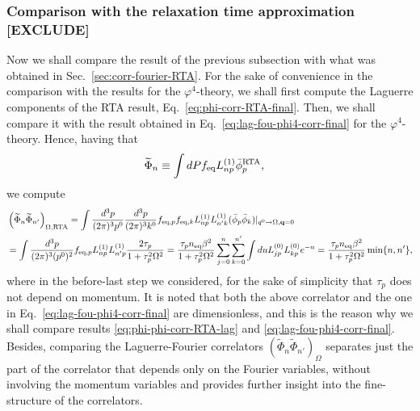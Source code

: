 \documentclass[aps,prd,preprint,nofootinbib,amsmath,amssymb,showpacs,longbibliography,singlecolumn,superscriptaddress,10pt]{revtex4-1}
\theoremstyle{plain}
\theoremstyle{definition}
\begin{document}
\subsubsection{Comparison with the relaxation time approximation [EXCLUDE]}

Now we shall compare the result of the previous subsection with what was obtained in Sec.~\ref{sec:corr-fourier-RTA}. For the sake of convenience in the comparison with the results for the $\varphi^{4}$-theory, we shall first compute the Laguerre components of the RTA result, Eq.~\eqref{eq:phi-corr-RTA-final}. Then, we shall compare it with the result obtained in Eq.~\eqref{eq:lag-fou-phi4-corr-final} for the $\varphi^{4}$-theory. Hence, having that 
%
\begin{equation}
\begin{aligned}
&
\widetilde{\Phi}_{n}
\equiv
\int dP f_{\mathrm{eq}}  L^{(1)}_{n {p}}  \Bar{\phi}_{p}^{\mathrm{RTA}},
\end{aligned}    
\end{equation}
%
we compute 
%
\begin{equation}
\label{eq:phi-phi-corr-RTA-lag}
\begin{aligned}
&
\left( \widetilde{\Phi}_n \widetilde{\Phi}_{n'} \right)_{\Omega, \mathrm{RTA}} 
=
\int \frac{d^{3}p}{(2 \pi)^{3} p^{0}} \frac{d^{3}p}{(2 \pi)^{3} k^{0}} f_{\mathrm{eq},p} f_{\mathrm{eq},k}  L^{(1)}_{n {p}} L^{(1)}_{n' {k}} 
(\Bar{\phi}_{p} \Bar{\phi}_{k}
)\vert_{q^{0} \to \Omega,{\bf q} = 0}
\\
&
=
\int \frac{d^{3}p}{(2 \pi)^{3} (p^{0})^{2}}  f_{\mathrm{eq},p}   L^{(1)}_{n {p}} L^{(1)}_{n' {p}} 
\dfrac{2\tau_p}{1+\tau^2_p\Omega^2}
=
\frac{\tau_{p} n_{\mathrm{eq}} \beta^{2}}{1 + \tau_{p}^{2} \Omega^{2}}
\sum_{j=0}^{n} \sum_{k=0}^{n'} \int du L^{(0)}_{j {p}} L^{(0)}_{k {p}} e^{-u}
= 
\frac{\tau_{p} n_{\mathrm{eq}} \beta^{2}}{1 + \tau_{p}^{2} \Omega^{2}}
\min\{ n, n' \},
\end{aligned}    
\end{equation}
%
where in the before-last step we considered, for the sake of simplicity that $\tau_{p}$ does not depend on momentum.
It is noted that both the above correlator and the one in Eq.~\eqref{eq:lag-fou-phi4-corr-final} are dimensionless, and this is the reason why we shall compare results \eqref{eq:phi-phi-corr-RTA-lag} and \eqref{eq:lag-fou-phi4-corr-final}. Besides, comparing the Laguerre-Fourier correlators $\left( \widetilde{\Phi}_n \widetilde{\Phi}_{n'}  \right)_{\Omega}$ separates just the part of the correlator that depends only on the Fourier variables, without involving the momentum variables and provides further insight into the fine-structure of the correlators. 
\end{document}

